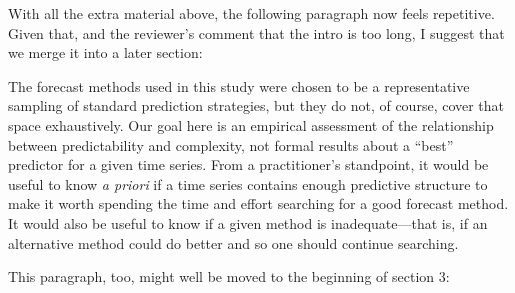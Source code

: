 \alert{With all the extra material above, the following paragraph now
  feels repetitive.  Given that, and the reviewer's comment that the
  intro is too long, I suggest that we merge it into a later section:}

The forecast methods used in this study were chosen to be a
representative sampling of standard prediction strategies, but they do
not, of course, cover that space exhaustively.  Our goal here is an
empirical assessment of the relationship between predictability and
complexity, not formal results about a ``best'' predictor for a given
time series.  From a practitioner's standpoint, it would be useful to
know \emph{ a priori} if a time series contains enough predictive
structure to make it worth spending the time and effort searching for
a good forecast method.  It would also be useful to know if a given
method is inadequate---that is, if an alternative method could do
better and so one should continue searching.


\alert{This paragraph, too, might well be moved to the beginning of
  section 3:}

